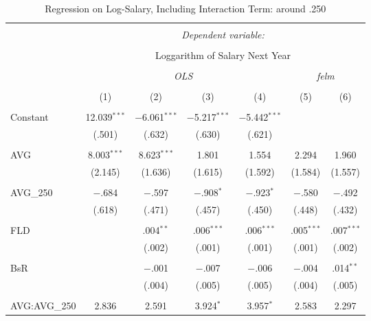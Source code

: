 
\begin{table}[H] \centering
  \caption{Regression on Log-Salary, Including Interaction Term: around .250}
  \label{AVG250_E}
\tiny
\begin{tabular}{@{\extracolsep{5pt}}lcccccc}
\\[-1.8ex]\hline
\hline \\[-1.8ex]
 & \multicolumn{6}{c}{\textit{Dependent variable:}} \\
\cline{2-7}
\\[-1.8ex] & \multicolumn{6}{c}{Loggarithm of Salary Next Year} \\
\\[-1.8ex] & \multicolumn{4}{c}{\textit{OLS}} & \multicolumn{2}{c}{\textit{felm}} \\
\\[-1.8ex] & (1) & (2) & (3) & (4) & (5) & (6)\\
\hline \\[-1.8ex]
 Constant & 12.039$^{***}$ & $-$6.061$^{***}$ & $-$5.217$^{***}$ & $-$5.442$^{***}$ &  &  \\
  & (.501) & (.632) & (.630) & (.621) &  &  \\
  & & & & & & \\
 AVG & 8.003$^{***}$ & 8.623$^{***}$ & 1.801 & 1.554 & 2.294 & 1.960 \\
  & (2.145) & (1.636) & (1.615) & (1.592) & (1.584) & (1.557) \\
  & & & & & & \\
 AVG\_250 & $-$.684 & $-$.597 & $-$.908$^{*}$ & $-$.923$^{*}$ & $-$.580 & $-$.492 \\
  & (.618) & (.471) & (.457) & (.450) & (.448) & (.432) \\
  & & & & & & \\
 FLD &  & .004$^{**}$ & .006$^{***}$ & .006$^{***}$ & .005$^{***}$ & .007$^{***}$ \\
  &  & (.002) & (.001) & (.001) & (.001) & (.002) \\
  & & & & & & \\
 BsR &  & $-$.001 & $-$.007 & $-$.006 & $-$.004 & .014$^{**}$ \\
  &  & (.004) & (.005) & (.005) & (.004) & (.005) \\
  & & & & & & \\
 AVG:AVG\_250 & 2.836 & 2.591 & 3.924$^{*}$ & 3.957$^{*}$ & 2.583 & 2.297 \\

\end{tabular}
\end{table}
